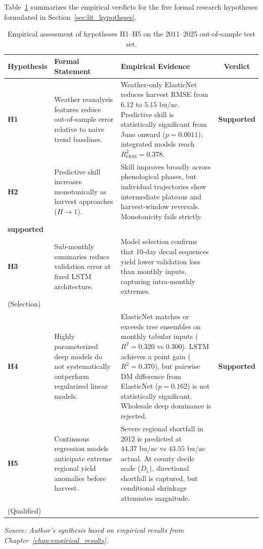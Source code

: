 Table~\ref{tab:hypotheses_verdicts} summarizes the empirical verdicts for the five formal research hypotheses formulated in Section~\ref{sec:lit_hypotheses}.

\begin{table}[htbp]
\centering
\singlespacing
\footnotesize
\setlength{\tabcolsep}{5.0pt}
\renewcommand{\arraystretch}{1.2}
\caption{Empirical assessment of hypotheses H1--H5 on the 2011--2025 out-of-sample test set.}
\label{tab:hypotheses_verdicts}
\begin{tabularx}{\textwidth}{@{} l p{3.8cm} X c @{}}
\toprule
\textbf{Hypothesis} & \textbf{Formal Statement} & \textbf{Empirical Evidence} & \textbf{Verdict} \\
\midrule
\textbf{H1} & Weather reanalysis features reduce out-of-sample error relative to naive trend baselines. & Weather-only ElasticNet reduces harvest RMSE from $6.12$ to $5.15\text{ bu/ac}$. Predictive skill is statistically significant from June onward ($p=0.0011$); integrated models reach $R^2_{\text{OOS}} = 0.378$. & \textbf{Supported} \\
\textbf{H2} & Predictive skill increases monotonically as harvest approaches ($H \to 1$). & Skill improves broadly across phenological phases, but individual trajectories show intermediate plateaus and harvest-window reversals. Monotonicity fails strictly. & \shortstack{\textbf{Not}\\\textbf{supported}} \\
\textbf{H3} & Sub-monthly summaries reduce validation error at fixed LSTM architecture. & Model selection confirms that 10-day decad sequences yield lower validation loss than monthly inputs, capturing intra-monthly extremes. & \shortstack{\textbf{Supported}\\\scriptsize{(Selection)}} \\
\textbf{H4} & Highly parameterized deep models do not systematically outperform regularized linear models. & ElasticNet matches or exceeds tree ensembles on monthly tabular inputs ($R^2=0.320$ vs $0.300$). LSTM achieves a point gain ($R^2=0.370$), but pairwise DM difference from ElasticNet ($p=0.162$) is not statistically significant. Wholesale deep dominance is rejected. & \textbf{Supported} \\
\textbf{H5} & Continuous regression models anticipate extreme regional yield anomalies before harvest. & Severe regional shortfall in 2012 is predicted at $44.37\text{ bu/ac}$ vs $43.55\text{ bu/ac}$ actual. At county decile scale ($D_1$), directional shortfall is captured, but conditional shrinkage attenuates magnitude. & \shortstack{\textbf{Supported}\\\scriptsize{(Qualified)}} \\
\bottomrule
\end{tabularx}
\vspace{0.2em}
{\footnotesize \textit{Source: Author's synthesis based on empirical results from Chapter~\ref{chap:empirical_results}.}}
\end{table}

